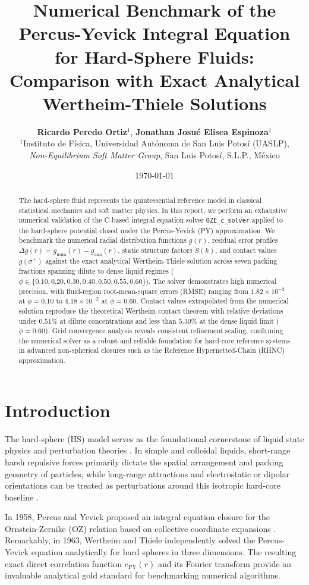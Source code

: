 \documentclass[11pt,a4paper]{article}
\title{\textbf{Numerical Benchmark of the Percus-Yevick Integral Equation for Hard-Sphere Fluids: Comparison with Exact Analytical Wertheim-Thiele Solutions}}
\author{
    \textbf{Ricardo Peredo Ortiz}$^{1}$, \textbf{Jonathan Josu\'{e} Elisea Espinoza}$^{1}$ \\
    \small $^{1}$Instituto de F\'{i}sica, Universidad Aut\'{o}noma de San Luis Potos\'{i} (UASLP), \\
    \small \textit{Non-Equilibrium Soft Matter Group}, San Luis Potos\'{i}, S.L.P., M\'{e}xico
}
\date{\today}
\begin{document}
\maketitle

\begin{abstract}
The hard-sphere fluid represents the quintessential reference model in classical statistical mechanics and soft matter physics. In this report, we perform an exhaustive numerical validation of the C-based integral equation solver \texttt{OZE\_c\_solver} applied to the hard-sphere potential closed under the Percus-Yevick (PY) approximation. We benchmark the numerical radial distribution functions $g(r)$, residual error profiles $\Delta g(r) = g_{\text{num}}(r) - g_{\text{ana}}(r)$, static structure factors $S(k)$, and contact values $g(\sigma^+)$ against the exact analytical Wertheim-Thiele solution across seven packing fractions spanning dilute to dense liquid regimes ($\phi \in \{0.10, 0.20, 0.30, 0.40, 0.50, 0.55, 0.60\}$). The solver demonstrates high numerical precision, with fluid-region root-mean-square errors (RMSE) ranging from $1.82 \times 10^{-3}$ at $\phi=0.10$ to $4.18 \times 10^{-2}$ at $\phi=0.60$. Contact values extrapolated from the numerical solution reproduce the theoretical Wertheim contact theorem with relative deviations under $0.51\%$ at dilute concentrations and less than $5.30\%$ at the dense liquid limit ($\phi=0.60$). Grid convergence analysis reveals consistent refinement scaling, confirming the numerical solver as a robust and reliable foundation for hard-core reference systems in advanced non-spherical closures such as the Reference Hypernetted-Chain (RHNC) approximation.
\end{abstract}

\section{Introduction}

The hard-sphere (HS) model serves as the foundational cornerstone of liquid state physics and perturbation theories \cite{hansen2013theory}. In simple and colloidal liquids, short-range harsh repulsive forces primarily dictate the spatial arrangement and packing geometry of particles, while long-range attractions and electrostatic or dipolar orientations can be treated as perturbations around this isotropic hard-core baseline \cite{weeks1971role, lado1982hypernetted, fries1985solution}.

In 1958, Percus and Yevick proposed an integral equation closure for the Ornstein-Zernike (OZ) relation based on collective coordinate expansions \cite{percus1958analysis}. Remarkably, in 1963, Wertheim \cite{wertheim1963exact} and Thiele \cite{thiele1963equation} independently solved the Percus-Yevick equation analytically for hard spheres in three dimensions. The resulting exact direct correlation function $c_{\text{PY}}(r)$ and its Fourier transform provide an invaluable analytical gold standard for benchmarking numerical algorithms.
\end{document}
